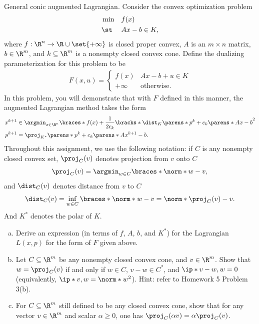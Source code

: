 \documentclass{article}
\theoremstyle{plain}
\theoremstyle{definition}
\theoremstyle{remark}
\begin{document}
\begin{problem}
    {General conic augmented Lagrangian.}
    Consider the convex optimization problem
    \begin{align}
        \label{eq:1}
        \begin{aligned}
            &\min && f(x) \\
            &\st && Ax-b \in K,
        \end{aligned}
    \end{align}
    where $f:\R^n\rightarrow\R\cup\set{+\infty}$ is closed proper convex, $A$ is an $m\times n$ matrix, $b\in\R^m$, and $k\subseteq \R^m$ is a nonempty closed convex cone. Define the dualizing parameterization for this problem to be
    \begin{align}
        \label{eq:2}
        F(x, u) = {
            \begin{cases}
                f(x) & Ax-b+u\in K \\
                +\infty & \text{otherwise}.
            \end{cases}
        }
    \end{align}
    In this problem, you will demonstrate that with $F$ defined in this manner, the augmented Lagrangian method takes the form
    \begin{align}
        x^{k+1} & \in \argmin_{x\in\R^n} \braces*{f(x) + \frac{1}{2c_k}\bracks*{\dist_K\parens*{p^k+c_k\parens*{Ax-b}}}^2} \label{eq:3} \\
        p^{k+1} &= \proj_{K^*}\parens*{p^k+c_k\parens*{Ax^{k+1}-b}}. \label{eq:4}
    \end{align}
    Throughout this assignment, we use the following notation: if $C$ is any nonempty closed convex set, $\proj_C(v)$ denotes projection from $v$ onto $C$
    \[\proj_C(v)=\argmin_{w\in C}\braces*{\norm*{w-v}},\]
    and $\dist_C(v)$ denotes distance from $v$ to $C$
    \[\dist_C(v)=\inf_{w\in C}\braces*{\norm*{w-v}}=\norm*{\proj_C(v)-v}.\]
    And $K^*$ denotes the polar of $K$.
    \begin{enumerate}[(a)]
        \item Derive an expression (in terms of $f$, $A$, $b$, and $K^*$) for the Lagrangian $L(x, p)$ for the form of $F$ given above.
        \item Let $C\subseteq \R^m$ be any nonempty closed convex cone, and $v\in\R^m$. Show that $w=\proj_C(v)$ if and only if $w\in C$, $v-w\in C^*$, and $\ip*{v-w, w} = 0$ (equivalently, $\ip*{v, w}=\norm*{w}^2$). Hint: refer to Homework 5 Problem 3(b).
        \item For $C\subseteq \R^m$ still defined to be any closed convex cone, show that for any vector $v\in\R^m$ and scalar $\alpha \geq 0$, one has $\proj_C(\alpha v)=\alpha \proj_C(v)$.

\end{enumerate}
\end{problem}
\end{document}
